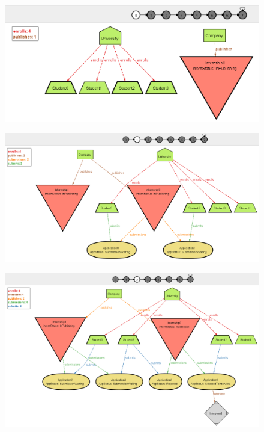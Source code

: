 \begin{figure}
    \centering
    \includegraphics[width=1\textwidth]{Images/Alloy/dyn1.png}\label{fig:dyn1}
\end{figure}
\begin{figure}
    \centering
    \includegraphics[width=1\textwidth]{Images/Alloy/dyn2.png}\label{fig:dyn2}
\end{figure}
\begin{figure}
    \centering
    \includegraphics[width=1\textwidth]{Images/Alloy/dyn3.png}\label{fig:dyn3}
\end{figure}
